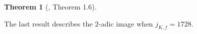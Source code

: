 \documentclass[11pt]{amsart}
\newtheorem{thm}[defn]{Theorem}
\theoremstyle{definition}
\newcommand{\Z}{\mathbb{Z}}
\newcommand{\GL}{\operatorname{GL}}
\begin{document}
\begin{thm}[\cite{lozano-galoiscm}, Theorem 1.6]
\begin{enumerate}
	\end{enumerate}
\end{thm}

The last result describes the $2$-adic image when $j_{K,f}=1728$.
\end{document}
